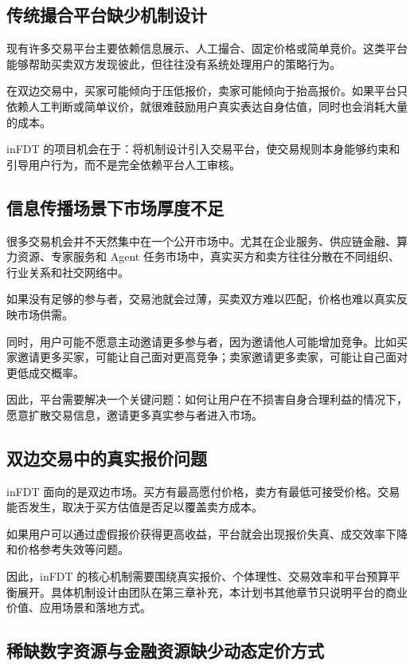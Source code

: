 \documentclass[UTF8,a4paper,12pt]{ctexart}
\begin{document}
\subsection{传统撮合平台缺少机制设计}

现有许多交易平台主要依赖信息展示、人工撮合、固定价格或简单竞价。这类平台能够帮助买卖双方发现彼此，但往往没有系统处理用户的策略行为。

在双边交易中，买家可能倾向于压低报价，卖家可能倾向于抬高报价。如果平台只依赖人工判断或简单议价，就很难鼓励用户真实表达自身估值，同时也会消耗大量的成本。

inFDT 的项目机会在于：将机制设计引入交易平台，使交易规则本身能够约束和引导用户行为，而不是完全依赖平台人工审核。

\subsection{信息传播场景下市场厚度不足}

很多交易机会并不天然集中在一个公开市场中。尤其在企业服务、供应链金融、算力资源、专家服务和 Agent 任务市场中，真实买方和卖方往往分散在不同组织、行业关系和社交网络中。

如果没有足够的参与者，交易池就会过薄，买卖双方难以匹配，价格也难以真实反映市场供需。

同时，用户可能不愿意主动邀请更多参与者，因为邀请他人可能增加竞争。比如买家邀请更多买家，可能让自己面对更高竞争；卖家邀请更多卖家，可能让自己面对更低成交概率。

因此，平台需要解决一个关键问题：如何让用户在不损害自身合理利益的情况下，愿意扩散交易信息，邀请更多真实参与者进入市场。

\subsection{双边交易中的真实报价问题}

inFDT 面向的是双边市场。买方有最高愿付价格，卖方有最低可接受价格。交易能否发生，取决于买方估值是否足以覆盖卖方成本。

如果用户可以通过虚假报价获得更高收益，平台就会出现报价失真、成交效率下降和价格参考失效等问题。

因此，inFDT 的核心机制需要围绕真实报价、个体理性、交易效率和平台预算平衡展开。具体机制设计由团队在第三章补充，本计划书其他章节只说明平台的商业价值、应用场景和落地方式。

\subsection{稀缺数字资源与金融资源缺少动态定价方式}
\end{document}
